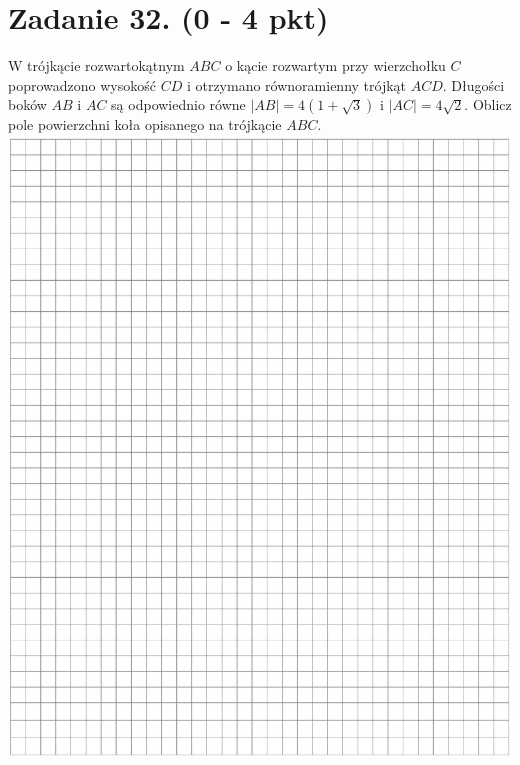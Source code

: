 \documentclass[10pt]{article}
\begin{document}
\section*{Zadanie 32. (0 - 4 pkt)}
W trójkącie rozwartokątnym \(A B C\) o kącie rozwartym przy wierzchołku \(C\) poprowadzono wysokość \(C D\) i otrzymano równoramienny trójkąt \(A C D\). Długości boków \(A B\) i \(A C\) są odpowiednio równe \(|A B|=4(1+\sqrt{3})\) i \(|A C|=4 \sqrt{2}\). Oblicz pole powierzchni koła opisanego na trójkącie \(A B C\).\\
\includegraphics[max width=\textwidth, center]{2024_11_21_997c30e0b98e62837d84g-16}\\
\end{document}
